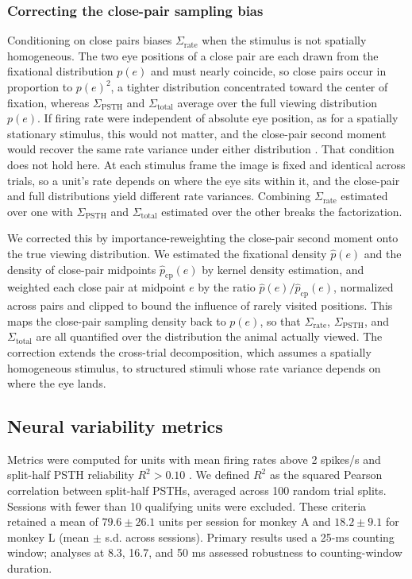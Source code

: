 \documentclass{lite}
\newcommand{\Cpsth}{\Sigma_{\text{PSTH}}}
\newcommand{\Ctotal}{\Sigma_{\text{total}}}
\newcommand{\Crate}{\Sigma_{\text{rate}}}
\begin{document}
\subsubsection{Correcting the close-pair sampling bias}
Conditioning on close pairs biases $\Crate$ when the stimulus is not spatially homogeneous. The two eye positions of a close pair are each drawn from the fixational distribution $p(e)$ and must nearly coincide, so close pairs occur in proportion to $p(e)^2$, a tighter distribution concentrated toward the center of fixation, whereas $\Cpsth$ and $\Ctotal$ average over the full viewing distribution $p(e)$. If firing rate were independent of absolute eye position, as for a spatially stationary stimulus, this would not matter, and the close-pair second moment would recover the same rate variance under either distribution \cite{mcfarland2016variability}. That condition does not hold here. At each stimulus frame the image is fixed and identical across trials, so a unit's rate depends on where the eye sits within it, and the close-pair and full distributions yield different rate variances. Combining $\Crate$ estimated over one with $\Cpsth$ and $\Ctotal$ estimated over the other breaks the factorization.

We corrected this by importance-reweighting the close-pair second moment onto the true viewing distribution. We estimated the fixational density $\hat{p}(e)$ and the density of close-pair midpoints $\hat{p}_{\text{cp}}(e)$ by kernel density estimation, and weighted each close pair at midpoint $e$ by the ratio $\hat{p}(e) / \hat{p}_{\text{cp}}(e)$, normalized across pairs and clipped to bound the influence of rarely visited positions. This maps the close-pair sampling density back to $p(e)$, so that $\Crate$, $\Cpsth$, and $\Ctotal$ are all quantified over the distribution the animal actually viewed. The correction extends the cross-trial decomposition, which assumes a spatially homogeneous stimulus, to structured stimuli whose rate variance depends on where the eye lands.

\subsection{Neural variability metrics}
Metrics were computed for units with mean firing rates above 2 spikes/s and split-half PSTH reliability $R^2 > 0.10$ \cite{schoppe2016measuring}. We defined $R^2$ as the squared Pearson correlation between split-half PSTHs, averaged across 100 random trial splits. Sessions with fewer than 10 qualifying units were excluded. These criteria retained a mean of $79.6 \pm 26.1$ units per session for monkey A and $18.2 \pm 9.1$ for monkey L (mean $\pm$ s.d. across sessions). Primary results used a 25-ms counting window; analyses at 8.3, 16.7, and 50 ms assessed robustness to counting-window duration.
\end{document}
